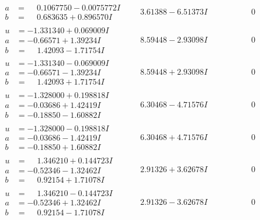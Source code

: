 \documentclass[1p]{elsarticle_modified}
\theoremstyle{definition}
\begin{document}
$$\begin{array}{c|c|c}
\begin{aligned}
a &= \phantom{-}0.1067750 - 0.0075772 I \\
b &= \phantom{-}0.683635 + 0.896570 I\end{aligned}
 & \phantom{-}3.61388 - 6.51373 I & \phantom{-0.000000 } 0 \\ \hline\begin{aligned}
u &= -1.331340 + 0.069009 I \\
a &= -0.66571 + 1.39234 I \\
b &= \phantom{-}1.42093 - 1.71754 I\end{aligned}
 & \phantom{-}8.59448 - 2.93098 I & \phantom{-0.000000 } 0 \\ \hline\begin{aligned}
u &= -1.331340 - 0.069009 I \\
a &= -0.66571 - 1.39234 I \\
b &= \phantom{-}1.42093 + 1.71754 I\end{aligned}
 & \phantom{-}8.59448 + 2.93098 I & \phantom{-0.000000 } 0 \\ \hline\begin{aligned}
u &= -1.328000 + 0.198818 I \\
a &= -0.03686 + 1.42419 I \\
b &= -0.18850 - 1.60882 I\end{aligned}
 & \phantom{-}6.30468 - 4.71576 I & \phantom{-0.000000 } 0 \\ \hline\begin{aligned}
u &= -1.328000 - 0.198818 I \\
a &= -0.03686 - 1.42419 I \\
b &= -0.18850 + 1.60882 I\end{aligned}
 & \phantom{-}6.30468 + 4.71576 I & \phantom{-0.000000 } 0 \\ \hline\begin{aligned}
u &= \phantom{-}1.346210 + 0.144723 I \\
a &= -0.52346 - 1.32462 I \\
b &= \phantom{-}0.92154 + 1.71078 I\end{aligned}
 & \phantom{-}2.91326 + 3.62678 I & \phantom{-0.000000 } 0 \\ \hline\begin{aligned}
u &= \phantom{-}1.346210 - 0.144723 I \\
a &= -0.52346 + 1.32462 I \\
b &= \phantom{-}0.92154 - 1.71078 I\end{aligned}
 & \phantom{-}2.91326 - 3.62678 I & \phantom{-0.000000 } 0\\

\end{array}$$
\end{document}
